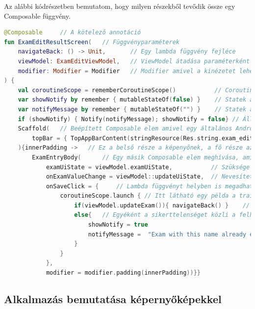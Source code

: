 Az alábbi kódrészetben bemutatom, hogy milyen részekből tevődik össze egy Composable függvény.
\begin{lstlisting}[caption={Composable függvény részei.}, label={lst:ComposableParts}, language=Kotlin]
@Composable     // A kötelező annotáció
fun ExamEditResultScreen(   // Függvényparaméterek
    navigateBack: () -> Unit,       // Egy lambda függvény fejléce
    viewModel: ExamEditViewModel,   // ViewModel átadása paraméterként
    modifier: Modifier = Modifier   // Modifier amivel a kinézetet lehet testre szabdni.
) {
    val coroutineScope = rememberCoroutineScope()           // Coroutine scope lekérése, így lambda függényben használható, mivel annak a törzse nem Composable függvény.
    var showNotify by remember { mutableStateOf(false) }    // Statek amit el lehet tárolni a Composable függvényben mivel ezen kívül nincs használva.
    var notifyMessage by remember { mutableStateOf("") }    // Statek amit el lehet tárolni a Composable függvényben mivel ezen kívül nincs használva.
    if (showNotify) { Notify(notifyMessage); showNotify = false} // Állapottól függő megjelenítés
    Scaffold(   // Beépített Composable elem amivel egy általános Android nézetet könnyen létre lehet hozni.
        topBar = { TopAppBarContent(stringResource(Res.string.exam_edit), navigateBack) },  // Itt egy topBart lehet könnyen megadni.
    ){innerPadding ->   // Ez a belső része a képenyőnek, a fő része az alkalmazásnak.
        ExamEntryBody(      // Egy másik Composable elem meghívása, ami a megjelnésért felel.
            examUiState = viewModel.examUiState,           // Szüksége van viewModelben lévő statere
            onExamValueChange = viewModel::updateUiState,  // Nevesített függvényt így lehet átadni egy lambda függvénynek
            onSaveClick = {     // Lambda függvényt helyben is megadhatunk
                coroutineScope.launch { // Itt látható egy példa a trailing lambda használatára
                    if(viewModel.updateExam()){ navigateBack() }    // If-else szerkezet is nyugodtan használhatunk. Siker esetén visszanavigál
                    else{   // Egyéként a sikerttelenséget közli a felhasználóval
                        showNotify = true
                        notifyMessage =  "Exam with this name already exists"
                    }
                }
            },
            modifier = modifier.padding(innerPadding))}}
\end{lstlisting}

\subsection{Alkalmazás bemutatása képernyőképekkel}

